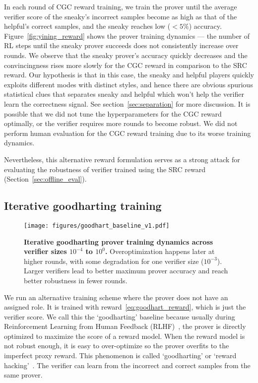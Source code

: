 \documentclass{article}
\begin{document}
In each round of CGC reward training, we train the prover until the average verifier score of the sneaky's incorrect samples become as high as that of the helpful's correct samples, and the sneaky reaches low ($<5\%$) accuracy. Figure~\ref{fig:yining_reward} shows the prover training dynamics --- the number of RL steps until the sneaky prover succeeds does not consistently increase over rounds. We observe that the sneaky prover's accuracy quickly decreases and the convincingness rises more slowly for the CGC reward in comparison to the SRC reward. Our hypothesis is that in this case, the sneaky and helpful players quickly exploits different modes with distinct styles, and hence there are obvious spurious statistical clues that separates sneaky and helpful which won't help the verifier learn the correctness signal. See section~\ref{sec:separation} for more discussion. It is possible that we did not tune the hyperparameters for the CGC reward optimally, or the verifier requires more rounds to become robust. We did not perform human evaluation for the CGC reward training due to its worse training dynamics.

Nevertheless, this alternative reward formulation serves as a strong attack for evaluating the robustness of verifier trained using the SRC reward (Section~\ref{sec:offline_eval}).
\subsection{Iterative goodharting training}
\label{sec:goodharting}
\begin{figure}
    \centering
    \texttt{[image: figures/goodhart\_baseline\_v1.pdf]}
    \caption{\textbf{Iterative goodharting prover training dynamics across verifier sizes $10^{-4}$ to $10^0$.} Overoptimization happens later at higher rounds, with some degradation for one verifier size ($10^{-3}$). Larger verifiers lead to better maximum prover accuracy and reach better robustness in fewer rounds.}
    \label{fig:goodhart}
\end{figure}

We run an alternative training scheme where the prover does not have an assigned role. It is trained with reward~\eqref{eq:goodhart_reward}, which is just the verifier score. We call this the `goodharting' baseline because usually during Reinforcement Learning from Human Feedback (RLHF)~\citep{ouyang2022training}, the prover is directly optimized to maximize the score of a reward model. When the reward model is not robust enough, it is easy to over-optimize so the prover overfits to the imperfect proxy reward. This phenomenon is called `goodharting' or `reward hacking'~\citep{gao2023scaling, skalse2022defining}. The verifier can learn from the incorrect and correct samples from the same prover.
\end{document}
